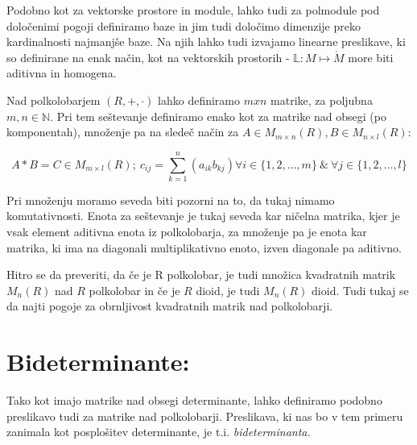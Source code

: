 \documentclass[mat1]{fmfdelo}
\newcommand{\N}{\mathbb N}
\newcommand{\pojem}[1]{\emph{#1}}
\begin{document}
Podobno kot za vektorske prostore in module, lahko tudi za polmodule pod določenimi pogoji definiramo baze in jim tudi določimo dimenzije preko kardinalnosti najmanjše baze. Na njih lahko tudi izvajamo linearne preslikave, ki so definirane na enak način, kot na vektorskih prostorih - $\mathbb{L}: M \mapsto \grave{M}$ more biti aditivna in homogena.

Nad polkolobarjem $(R, +, \cdot)$ lahko definiramo $mxn$ matrike, za poljubna $m,n\in\N$. Pri tem seštevanje definiramo enako kot za matrike nad obsegi (po komponentah), množenje pa na sledeč način za $A\in M_{m\times n}(R), B\in M_{n\times l}(R)$:

$$ 
	A*B = C \in M_{m\times l}(R);~ c_{ij} = \sum_{k = 1}^{n}(a_{ik}b_{kj}) \forall i \in \{1, 2, \ldots, m\}~\&~\forall j \in \{1, 2, \ldots, l\}
$$

Pri množenju moramo seveda biti pozorni na to, da tukaj nimamo komutativnosti. Enota za seštevanje je tukaj seveda kar ničelna matrika, kjer je vsak element aditivna enota iz polkolobarja, za množenje pa je enota kar matrika, ki ima na diagonali multiplikativno enoto, izven diagonale pa aditivno.

Hitro se da preveriti, da če je R polkolobar, je tudi množica kvadratnih matrik $M_n(R)$ nad $R$ polkolobar in če je $R$ dioid, je tudi $M_n(R)$ dioid. Tudi tukaj se da najti pogoje za obrnljivost kvadratnih matrik nad polkolobarji. 

\section{Bideterminante:}

Tako kot imajo matrike nad obsegi determinante, lahko definiramo podobno preslikavo tudi za matrike nad polkolobarji. Preslikava, ki nas bo v tem primeru zanimala kot posplošitev determinante, je t.i. \pojem{bideterminanta.}
\end{document}
